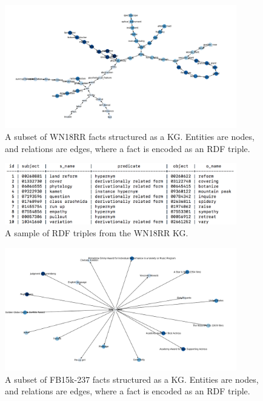 \begin{figure}[H]
   	\centering
    	\includegraphics[width=0.9\textwidth, height=0.5\textwidth]{WN18RR_Graph}
	\caption{A subset of WN18RR facts structured as a KG. Entities are nodes, and relations are edges, where a fact is encoded as an RDF triple.}
\end{figure}

\begin{figure}[H]
   	\centering
    	\includegraphics[width=0.9\textwidth, height=0.3\textwidth]{wn18rr_fact_sample}
	\caption{A sample of RDF triples from the WN18RR KG.}
\end{figure}

\begin{figure}[H]
   	\centering
    	\includegraphics[width=0.9\textwidth, height=0.5\textwidth]{FB15k-237_Graph}
	\caption{A subset of FB15k-237 facts structured as a KG. Entities are nodes, and relations are edges, where a fact is encoded as an RDF triple.}
\end{figure}

